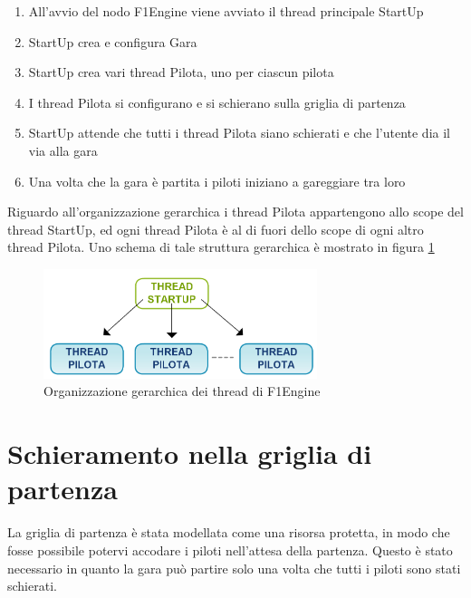 \documentclass[a4paper,11pt, twoside, openright]{book}
\begin{document}
      \begin{enumerate}
        \item All'avvio del nodo F1Engine viene avviato il thread principale StartUp
	\item StartUp crea e configura Gara
	\item StartUp crea vari thread Pilota, uno per ciascun pilota
	\item I thread Pilota si configurano e si schierano sulla griglia di partenza
	\item StartUp attende che tutti i thread Pilota siano schierati e che l'utente dia il via alla gara
	\item Una volta che la gara è partita i piloti iniziano a gareggiare tra loro
      \end{enumerate}
      
      Riguardo all'organizzazione gerarchica i thread Pilota appartengono allo scope del thread StartUp,
      ed ogni thread Pilota è al di fuori dello scope di ogni altro thread Pilota. Uno schema di tale
      struttura gerarchica è mostrato in figura \ref{fig:OrganizzazioneThreadF1Engine}
      
      \begin{figure}[ht]
	\centering
	\includegraphics[width=80mm]{./Immagini/OrganizzazioneThreadF1Engine.png}
	\caption{Organizzazione gerarchica dei thread di F1Engine}
	\label{fig:OrganizzazioneThreadF1Engine}
      \end{figure}

    
    \section{Schieramento nella griglia di partenza}
    \label{Schieramento nella griglia di partenza}
      La griglia di partenza è stata modellata come una risorsa protetta, in modo che fosse possibile
      potervi accodare i piloti
      nell'attesa della partenza. Questo è stato necessario in quanto la gara può partire solo 
      una volta che tutti i piloti sono stati schierati.
      
\end{document}
